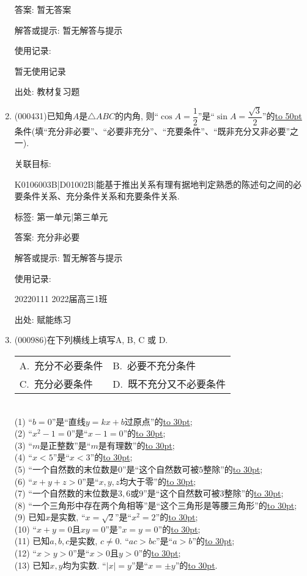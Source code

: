 \documentclass[10pt,a4paper]{article}
\newcommand{\blank}[1]{\underline{\hbox to #1pt{}}}
\newcommand{\twoch}[4]{\par\begin{tabular}{p{.46\textwidth}p{.46\textwidth}}
A.~#1& B.~#2\\
C.~#3& D.~#4
\end{tabular}}
\begin{document}
\begin{enumerate}[1.]
答案: 暂无答案

解答或提示: 暂无解答与提示

使用记录:

暂无使用记录


出处: 教材复习题
\item { (000431)}已知角$A$是$\triangle ABC$的内角, 则``$\cos A=\dfrac12$''是``$\sin A=\dfrac{\sqrt3}2$''的\blank{50}条件(填``充分非必要''、``必要非充分''、``充要条件''、``既非充分又非必要''之一).


关联目标:

K0106003B|D01002B|能基于推出关系有理有据地判定熟悉的陈述句之间的必要条件关系、充分条件关系和充要条件关系.



标签: 第一单元|第三单元

答案: 充分非必要

解答或提示: 暂无解答与提示

使用记录:

20220111	2022届高三1班	


出处: 赋能练习
\item { (000986)}在下列横线上填写A, B, C 或 D. \\ 
\twoch{充分不必要条件}{必要不充分条件}{充分必要条件}{既不充分又不必要条件}\\ 
(1) ``$b=0$''是``直线$y=kx+b$过原点''的\blank{30};\\ 
(2) ``$x^2-1=0$''是``$x-1=0$''的\blank{30};\\ 
(3) ``$m$是正整数''是``$m$是有理数''的\blank{30};\\ 
(4) ``$x<5$''是``$x<3$''的\blank{30};\\ 
(5) ``一个自然数的末位数是$0$''是``这个自然数可被$5$整除''的\blank{30};\\ 
(6) ``$x+y+z>0$''是``$x,y,z$均大于零''的\blank{30};\\ 
(7) ``一个自然数的末位数是$3,6$或$9$''是``这个自然数可被$3$整除''的\blank{30};\\ 
(8) ``一个三角形中存在两个角相等''是``这个三角形是等腰三角形''的\blank{30};\\ 
(9) 已知$x$是实数, ``$x=\sqrt{2}$''是``$x^2=2$''的\blank{30};\\ 
(10) ``$x+y=0$且$xy=0$''是''$x=y=0$''的\blank{30};\\ 
(11) 已知$a,b,c$是实数, $c \ne 0$. ``$ac>bc$''是``$a>b$''的\blank{30};\\ 
(12) ``$x>y>0$''是``$x>0$且$y>0$''的\blank{30};\\ 
(13) 已知$x,y$均为实数. ``$|x|=y$''是``$x=\pm y$''的\blank{30}.



\end{enumerate}
\end{document}
